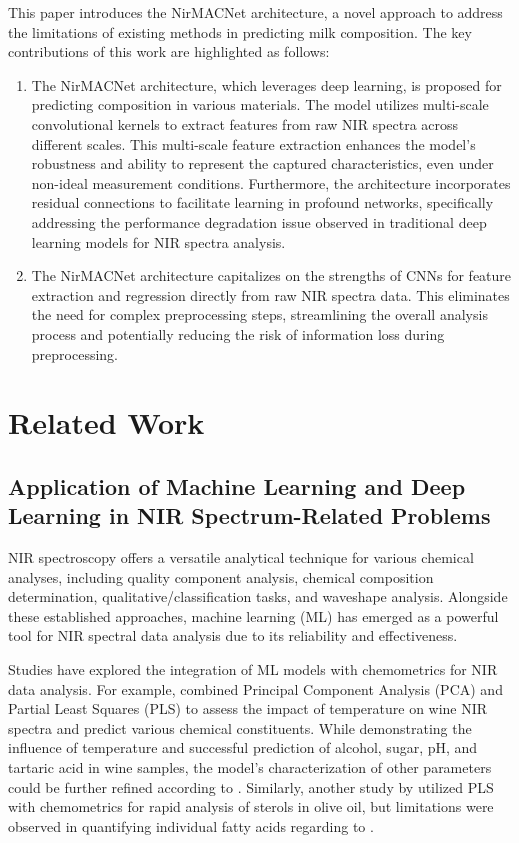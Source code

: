 \documentclass[10pt, a4paper, oneside]{article}
\begin{document}
This paper introduces the NirMACNet architecture, a novel approach to address the limitations of existing methods in predicting milk composition. The key contributions of this work are highlighted as follows:
\begin{enumerate}
    \item  The NirMACNet architecture, which leverages deep learning, is proposed for predicting composition in various materials. The model utilizes multi-scale convolutional kernels to extract features from raw NIR spectra across different scales. This multi-scale feature extraction enhances the model's robustness and ability to represent the captured characteristics, even under non-ideal measurement conditions. Furthermore, the architecture incorporates residual connections to facilitate learning in profound networks, specifically addressing the performance degradation issue observed in traditional deep learning models for NIR spectra analysis.
    \item  The NirMACNet architecture capitalizes on the strengths of CNNs for feature extraction and regression directly from raw NIR spectra data. This eliminates the need for complex preprocessing steps, streamlining the overall analysis process and potentially reducing the risk of information loss during preprocessing.
\end{enumerate}

\section{Related Work}\label{sec2}
\subsection{Application of Machine Learning and Deep Learning in NIR Spectrum-Related Problems}\label{sec2.1}
NIR spectroscopy offers a versatile analytical technique for various chemical analyses, including quality component analysis, chemical composition determination, qualitative/classification tasks, and waveshape analysis. Alongside these established approaches, machine learning (ML) has emerged as a powerful tool for NIR spectral data analysis due to its reliability and effectiveness.

Studies have explored the integration of ML models with chemometrics for NIR data analysis. For example, \cite{cozzolino2007effect} combined Principal Component Analysis (PCA) and Partial Least Squares (PLS) to assess the impact of temperature on wine NIR spectra and predict various chemical constituents. While demonstrating the influence of temperature and successful prediction of alcohol, sugar, pH, and tartaric acid in wine samples, the model's characterization of other parameters could be further refined according to \cite{zhang2022review}. Similarly, another study by \cite{ozdemir2018quantification} utilized PLS with chemometrics for rapid analysis of sterols in olive oil, but limitations were observed in quantifying individual fatty acids regarding to \cite{zhang2022review}.
\end{document}
